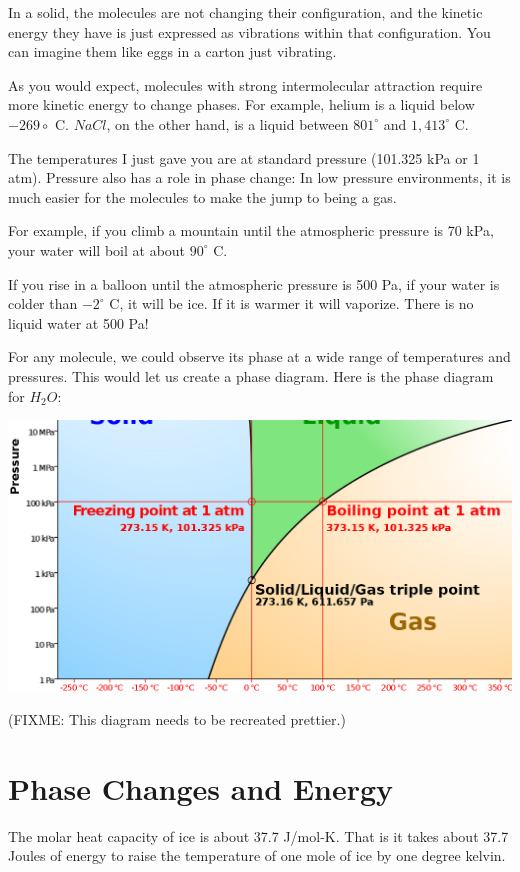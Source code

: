 In a solid, the molecules are not changing their configuration, and the kinetic energy they have is just expressed as vibrations within that configuration.   You can imagine them like eggs in a carton just vibrating.

As you would expect, molecules with strong intermolecular attraction require more kinetic energy to change phases.  For example,   helium is a liquid below $-269\circ$ C.  $NaCl$, on the other hand, is a liquid between $801^\circ$ and $1,413^\circ$ C.  

The temperatures I just gave you are at standard pressure (101.325 kPa or 1 atm).  Pressure also has a role in phase change:  In low pressure environments,  it is much easier for the molecules to make the jump to being a gas.

For example,  if you climb a mountain until the atmospheric pressure is 70 kPa,  your water will boil at about $90^\circ$ C.  

If you rise in a balloon until the atmospheric pressure is 500 Pa,  if your water is colder than $-2^\circ$ C,  it will be ice.  If it is warmer it will vaporize.    There is no liquid water at 500 Pa!

For any molecule,  we could observe its phase at a wide range of temperatures and pressures.  This would let us create a phase diagram.  Here is the phase diagram for $H_2O$:

\includegraphics[width=\textwidth]{waterphase_edit.png}

(FIXME: This diagram needs to be recreated prettier.)

\section{Phase Changes and Energy}

The molar heat capacity of ice is about 37.7 J/mol-K.  That is it takes about 37.7 Joules of energy to raise the temperature of one mole of ice by one degree kelvin.

